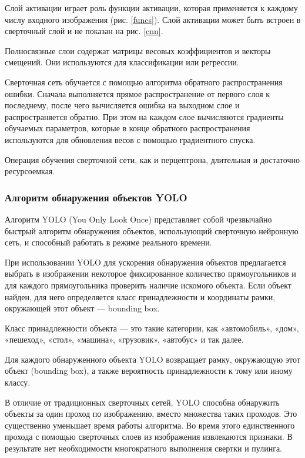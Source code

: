 Слой активации играет роль функции активации, которая применяется к каждому числу входного изображения (рис. \ref{funcs}). Слой активации может быть встроен в сверточный слой и не показан на рис. \ref{cnn}.

Полносвязные слои содержат матрицы весовых коэффициентов и векторы смещений. Они используются для классификации или регрессии.

Сверточная сеть обучается с помощью алгоритма обратного распространения ошибки. Сначала выполняется прямое распространение от первого слоя к последнему, после чего вычисляется ошибка на выходном слое и распространяется обратно. При этом на каждом слое вычисляются градиенты обучаемых параметров, которые в конце обратного распространения используются для обновления весов с помощью градиентного спуска.

Операция обучения сверточной сети, как и перцептрона, длительная и достаточно ресурсоемкая.

\subsubsection*{Алгоритм обнаружения объектов YOLO}

Алгоритм YOLO (You Only Look Once) представляет собой чрезвычайно быстрый алгоритм обнаружения объектов, использующий сверточную нейронную сеть, и способный работать в режиме реального времени.

При использовании YOLO для ускорения обнаружения объектов предлагается выбрать в изображении некоторое фиксированное количество прямоугольников и для каждого прямоугольника проверить наличие искомого объекта. Если объект найден, для него определяется класс принадлежности и координаты рамки, окружающей этот объект — bounding box.

Класс принадлежности объекта — это такие категории, как «автомобиль», «дом», «пешеход», «стол», «машина», «грузовик», «автобус» и так далее.

Для каждого обнаруженного объекта YOLO возвращает рамку, окружающую этот объект (bounding box), а также вероятность принадлежности к тому или иному классу.

В отличие от традиционных сверточных сетей, YOLO способна обнаружить объекты за один проход по изображению, вместо множества таких проходов. Это существенно уменьшает время работы алгоритма. Во время этого единственного прохода с помощью сверточных слоев из изображения извлекаются признаки. В результате нет необходимости многократного выполнения свертки и пулинга.

